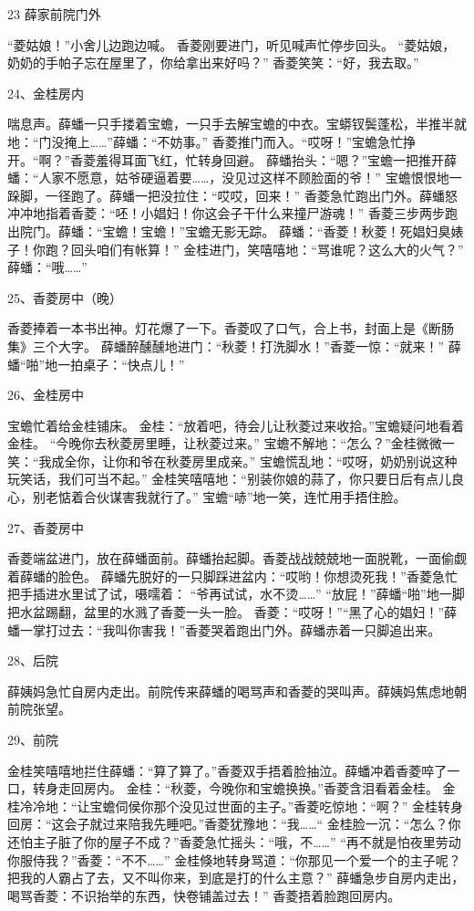 23 薛家前院门外\par
“菱姑娘！”小舍儿边跑边喊。
香菱刚要进门，听见喊声忙停步回头。
“菱姑娘，奶奶的手帕子忘在屋里了，你给拿出来好吗？”
香菱笑笑：“好，我去取。”

24、金桂房内\par
喘息声。薛蟠一只手搂着宝蟾，一只手去解宝蟾的中衣。宝蟒钗鬓蓬松，半推半就地：“门没掩上……”薛蟠：“不妨事。”
香菱推门而入。“哎呀！”宝蟾急忙挣开。“啊？”香菱羞得耳面飞红，忙转身回避。
薛蟠抬头：“嗯？”宝蟾一把推开薛蟠：“人家不愿意，姑爷硬逼着要……，没见过这样不顾脸面的爷！”
宝蟾恨恨地一跺脚，一径跑了。薛蟠一把没拉住：“哎哎，回来！”
香菱急忙跑出门外。薛蟠怒冲冲地指着香菱：“呸！小娼妇！你这会子干什么来撞尸游魂！”
香菱三步两步跑出院门。薛蟠：“宝蟾！宝蟾！”宝蟾无影无踪。
薛蟠：“香菱！秋菱！死娼妇臭婊子！你跑？回头咱们有帐算！”
金桂进门，笑嘻嘻地：“骂谁呢？这么大的火气？”
薛蟠：“哦……”

25、香菱房中（晚）\par
香菱捧着一本书出神。灯花爆了一下。香菱叹了口气，合上书，封面上是《断肠集》三个大字。
薛蟠醉醺醺地进门：“秋菱！打洗脚水！”香菱一惊：“就来！”
薛蟠“啪”地一拍桌子：“快点儿！”

26、金桂房中\par
宝蟾忙着给金桂铺床。
金桂：“放着吧，待会儿让秋菱过来收拾。”宝蟾疑问地看着金桂。
“今晚你去秋菱房里睡，让秋菱过来。”
宝蟾不解地：“怎么？”金桂微微一笑：“我成全你，让你和爷在秋菱房里成亲。”
宝蟾慌乱地：“哎呀，奶奶别说这种玩笑话，我们可当不起。”
金桂笑嘻嘻地：“别装你娘的蒜了，你只要日后有点儿良心，别老惦着合伙谋害我就行了。”
宝蟾“哧”地一笑，连忙用手捂住脸。

27、香菱房中\par
香菱端盆进门，放在薛蟠面前。薛蟠抬起脚。香菱战战兢兢地一面脱靴，一面偷觑着薛蟠的脸色。
薛蟠先脱好的一只脚踩进盆内：“哎哟！你想烫死我！”香菱急忙把手插进水里试了试，嗫嚅着：
“爷再试试，水不烫……”
“放屁！”薛蟠“啪”地一脚把水盆踢翻，盆里的水溅了香菱一头一脸。
香菱：“哎呀！”“黑了心的娼妇！”薛蟠一掌打过去：“我叫你害我！”香菱哭着跑出门外。薛蟠赤着一只脚追出来。

28、后院\par
薛姨妈急忙自房内走出。前院传来薛蟠的喝骂声和香菱的哭叫声。薛姨妈焦虑地朝前院张望。

29、前院\par
金桂笑嘻嘻地拦住薛蟠：“算了算了。”香菱双手捂着脸抽泣。薛蟠冲着香菱啐了一口，转身走回房内。
金桂：“秋菱，今晚你和宝蟾换换。”香菱含泪看着金桂。
金桂冷冷地：“让宝蟾伺侯你那个没见过世面的主子。”香菱吃惊地：“啊？”
金桂转身回房：“这会子就过来陪我先睡吧。”香菱犹豫地：“我……“
金桂脸一沉：“怎么？你还怕主子脏了你的屋子不成？”香菱急忙摇头：“哦，不……”
“再不就是怕夜里劳动你服侍我？”香菱：“不不……”
金桂倏地转身骂道：“你那见一个爱一个的主子呢？把我的人霸占了去，又不叫你来，到底是打的什么主意？”
薛蟠急步自房内走出，喝骂香菱：不识抬举的东西，快卷铺盖过去！”
香菱捂着脸跑回房内。

